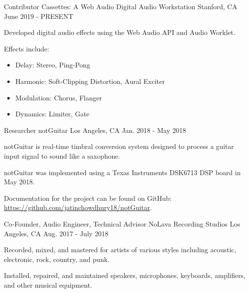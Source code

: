 \begin{cventries}
    \cventry
    {Contributor} %
    {Cassettes: A Web Audio Digital Audio Workstation} %
    {Stanford, CA} %
    {June 2019 - PRESENT} %
    {
      \begin{cvitems} %
        \item {Developed digital audio effects using the Web Audio API and Audio Worklet.}
        \item {Effects include:}
        \begin{itemize}
            \item {Delay: Stereo, Ping-Pong}
            \item {Harmonic: Soft-Clipping Distortion, Aural Exciter}
            \item {Modulation: Chorus, Flanger}
            \item {Dynamics: Limiter, Gate}
        \end{itemize}
      \end{cvitems}
    }

    \cventry
    {Researcher} %
    {notGuitar} %
    {Los Angeles, CA} %
    {Jan. 2018 - May 2018} %
    {
      \begin{cvitems} %
        \item {notGuitar is real-time timbral conversion system designed to process a guitar input signal to sound like a saxophone.}
        \item {notGuitar was implemented using a Texas Instruments DSK6713 DSP board in May 2018.}
        \item {Documentation for the project can be found on GitHub: \url{https://github.com/jatinchowdhury18/notGuitar}.}
      \end{cvitems}
    }

    \cventry
    {Co-Founder, Audio Engineer, Technical Advisor} %
    {NoLava Recording Studios} %
    {Los Angeles, CA} %
    {Aug. 2017 - July 2018} %
    {
      \begin{cvitems} %
        \item {Recorded, mixed, and mastered for artists of various styles including acoustic, electronic, rock, country, and punk.}
        \item {Installed, repaired, and maintained speakers, microphones, keyboards, amplifiers, and other musical equipment.}
      \end{cvitems}
    }

\end{cventries}
